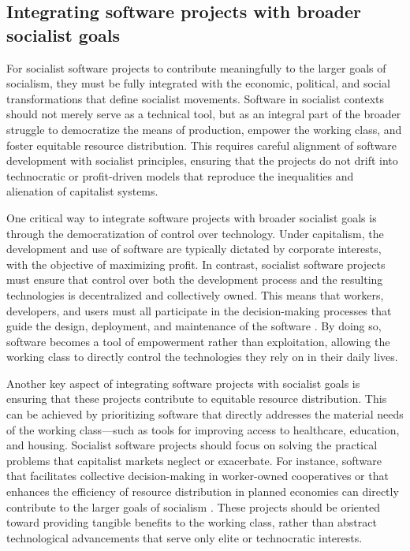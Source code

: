\begin{refsection}
\subsection{Integrating software projects with broader socialist goals}

For socialist software projects to contribute meaningfully to the larger goals of socialism, they must be fully integrated with the economic, political, and social transformations that define socialist movements. Software in socialist contexts should not merely serve as a technical tool, but as an integral part of the broader struggle to democratize the means of production, empower the working class, and foster equitable resource distribution. This requires careful alignment of software development with socialist principles, ensuring that the projects do not drift into technocratic or profit-driven models that reproduce the inequalities and alienation of capitalist systems.

One critical way to integrate software projects with broader socialist goals is through the democratization of control over technology. Under capitalism, the development and use of software are typically dictated by corporate interests, with the objective of maximizing profit. In contrast, socialist software projects must ensure that control over both the development process and the resulting technologies is decentralized and collectively owned. This means that workers, developers, and users must all participate in the decision-making processes that guide the design, deployment, and maintenance of the software \cite[pp.~123-126]{raymond2022}. By doing so, software becomes a tool of empowerment rather than exploitation, allowing the working class to directly control the technologies they rely on in their daily lives.

Another key aspect of integrating software projects with socialist goals is ensuring that these projects contribute to equitable resource distribution. This can be achieved by prioritizing software that directly addresses the material needs of the working class—such as tools for improving access to healthcare, education, and housing. Socialist software projects should focus on solving the practical problems that capitalist markets neglect or exacerbate. For instance, software that facilitates collective decision-making in worker-owned cooperatives or that enhances the efficiency of resource distribution in planned economies can directly contribute to the larger goals of socialism \cite[pp.~67-70]{ernesto1968}. These projects should be oriented toward providing tangible benefits to the working class, rather than abstract technological advancements that serve only elite or technocratic interests.


\end{refsection}
